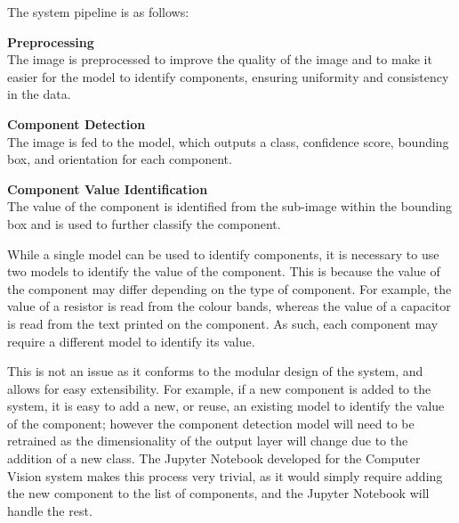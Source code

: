 The system pipeline is as follows:
\begin{mylist}
    \item \textbf{Preprocessing} \\
    The image is preprocessed to improve the quality of the image and to make it easier for the model to identify components, ensuring
    uniformity and consistency in the data.
    \item \textbf{Component Detection} \\
    The image is fed to the model, which outputs a class, confidence score, bounding box, and orientation for each component.
    \item \textbf{Component Value Identification} \\
    The value of the component is identified from the sub-image within the bounding box and is used to further classify the component.
\end{mylist}

While a single model can be used to identify components, it is necessary to use two models to identify the value of the component.
This is because the value of the component may differ depending on the type of component. For example, the value of a resistor
is read from the colour bands, whereas the value of a capacitor is read from the text printed on the component. As such, each
component may require a different model to identify its value.

This is not an issue as it conforms to the modular design of the system, and allows for easy extensibility. For example, if
a new component is added to the system, it is easy to add a new, or reuse, an existing model to identify the value of the component; however the 
component detection model will need to be retrained as the dimensionality of the output layer will change due to the addition
of a new class. The Jupyter Notebook developed for the Computer Vision system makes this process very trivial, as it would simply
require adding the new component to the list of components, and the Jupyter Notebook will handle the rest. 